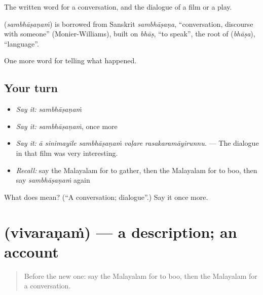 The written word for a conversation, and the dialogue of a film or a play.

\begin{cousinweb}
\textbf{} (\emph{sambhāṣaṇaṁ}) is borrowed from Sanskrit \emph{sambhāṣaṇa}, \textquotedblleft{}conversation, discourse with someone\textquotedblright{} (Monier-Williams), built on \emph{bhāṣ}, \textquotedblleft{}to speak\textquotedblright{}, the root of  (\emph{bhāṣa}), \textquotedblleft{}language\textquotedblright{}.
\end{cousinweb}

\begin{grammarlens}[title={What you've built}]
One more word for telling what happened.
\end{grammarlens}

\subsection*{Your turn}
\begin{itemize}
\raggedright
  \item \emph{Say it:} \emph{sambhāṣaṇaṁ}
  \item \emph{Say it:} \emph{sambhāṣaṇaṁ}, once more
  \item \emph{Say it:} \emph{ā sinimayile sambhāṣaṇaṁ vaḷare rasakaramāyirunnu.} — The dialogue in that film was very interesting.
  \item \emph{Recall:} say the Malayalam for to gather, then the Malayalam for to boo, then say \emph{sambhāṣaṇaṁ} again
\end{itemize}

\begin{tcolorbox}[breakable,colback=teal!4,colframe=teal!35!black,title={Before you move on}]
What does  mean? (\textquotedblleft{}A conversation; dialogue\textquotedblright{}.) Say it once more.
\end{tcolorbox}
\section[\texorpdfstring{\ml{വിവരണം} (vivaraṇaṁ)}{വിവരണം (vivaraṇaṁ)}]{ (vivaraṇaṁ) — a description; an account}

\label{lesson:ML-C356-vivaranam}



\begin{quote}
Before the new one: say the Malayalam for to boo, then the Malayalam for a conversation.
\end{quote}

